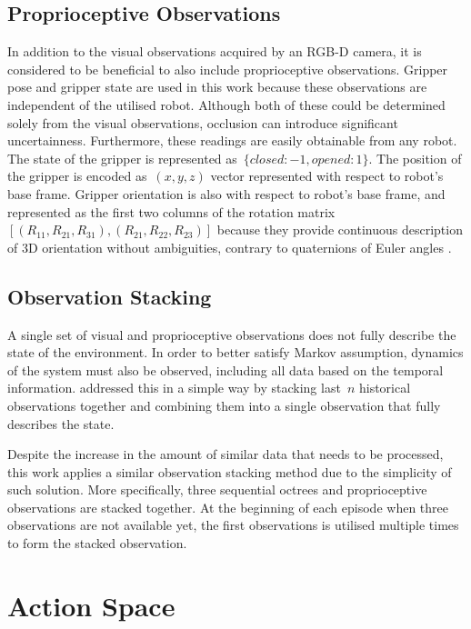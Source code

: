 \subsection{Proprioceptive Observations}

In addition to the visual observations acquired by an RGB-D camera, it is considered to be beneficial to also include proprioceptive observations. Gripper pose and gripper state are used in this work because these observations are independent of the utilised robot. Although both of these could be determined solely from the visual observations, occlusion can introduce significant uncertainness. Furthermore, these readings are easily obtainable from any robot. The state of the gripper is represented as~\(\{closed: -1, opened: 1\}\). The position of the gripper is encoded as~\((x,y,z)\) vector represented with respect to robot's base frame. Gripper orientation is also with respect to robot's base frame, and represented as the first two columns of the rotation matrix~\([(R_{11},R_{21},R_{31}),(R_{21},R_{22},R_{23})]\) because they provide continuous description of 3D orientation without ambiguities, contrary to quaternions of Euler angles \cite{zhou_continuity_2020}.


\subsection{Observation Stacking}

A single set of visual and proprioceptive observations does not fully describe the state of the environment. In order to better satisfy Markov assumption, dynamics of the system must also be observed, including all data based on the temporal information. \citet{mnih_human-level_2015} addressed this in a simple way by stacking last~\(n\) historical observations together and combining them into a single observation that fully describes the state.

Despite the increase in the amount of similar data that needs to be processed, this work applies a similar observation stacking method due to the simplicity of such solution. More specifically, three sequential octrees and proprioceptive observations are stacked together. At the beginning of each episode when three observations are not available yet, the first observations is utilised multiple times to form the stacked observation.


\section{Action Space}

